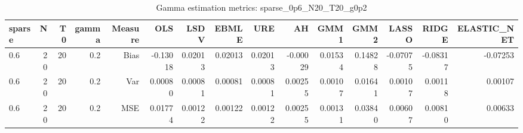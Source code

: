 \begin{table}[!htbp]\centering
\caption{Gamma estimation metrics: sparse_0p6_N20_T20_g0p2}
\label{tab:table1_sparse_0p6_N20_T20_g0p2}
\begin{tabular}{lrrrrrrrrrrrrrr}
\hline
sparse & N & T0 & gamma & Measure & OLS & LSDV & EBMLE & URE & AH & GMM1 & GMM2 & LASSO & RIDGE & ELASTIC_NET \\
\hline
0.6 & 20 & 20 & 0.2 & Bias & -0.13018 & 0.02013 & 0.02013 & 0.02013 & -0.00029 & 0.01534 & 0.14828 & -0.07075 & -0.08317 & -0.07253 \\
0.6 & 20 & 20 & 0.2 & Var & 0.00080 & 0.00081 & 0.00081 & 0.00081 & 0.00255 & 0.00107 & 0.01641 & 0.00107 & 0.00118 & 0.00107 \\
0.6 & 20 & 20 & 0.2 & MSE & 0.01774 & 0.00122 & 0.00122 & 0.00122 & 0.00255 & 0.00131 & 0.03840 & 0.00607 & 0.00810 & 0.00633 \\
\hline
\end{tabular}
\end{table}

